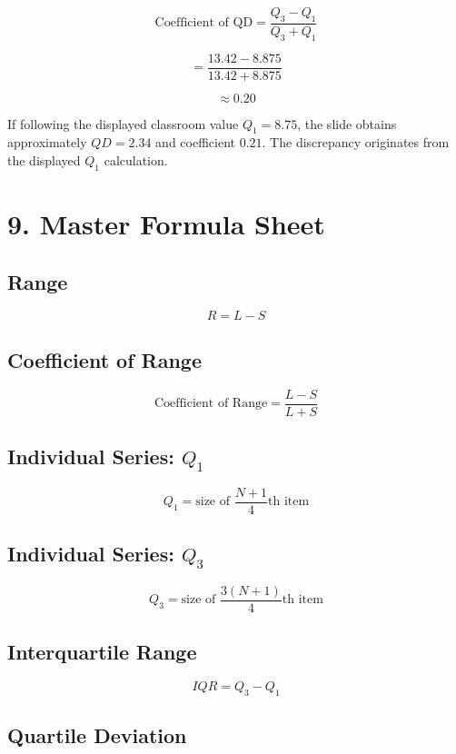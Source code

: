\documentclass[12pt,a4paper]{article}
\newcommand{\boxformula}[1]{%
\[
\boxed{\displaystyle #1}
\]
}
\begin{document}
\[
\text{Coefficient of QD}
=
\frac{Q_3-Q_1}{Q_3+Q_1}
\]

\[
=
\frac{13.42-8.875}{13.42+8.875}
\]

\[
\approx\boxed{0.20}
\]

If following the displayed classroom value $Q_1=8.75$, the slide obtains
approximately $QD=2.34$ and coefficient $0.21$. The discrepancy originates
from the displayed $Q_1$ calculation.

\section{9. Master Formula Sheet}

\subsection*{Range}

\boxformula{R=L-S}

\subsection*{Coefficient of Range}

\boxformula{
\text{Coefficient of Range}
=
\frac{L-S}{L+S}
}

\subsection*{Individual Series: $Q_1$}

\boxformula{
Q_1=\text{size of }\frac{N+1}{4}\text{th item}
}

\subsection*{Individual Series: $Q_3$}

\boxformula{
Q_3=\text{size of }\frac{3(N+1)}{4}\text{th item}
}

\subsection*{Interquartile Range}

\boxformula{IQR=Q_3-Q_1}

\subsection*{Quartile Deviation}
\end{document}
